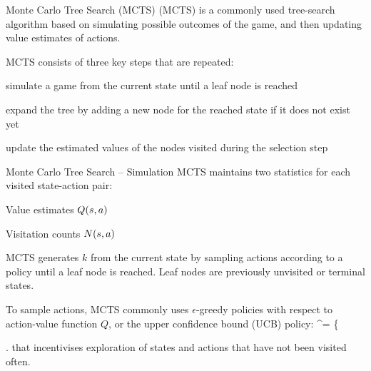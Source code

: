 \begin{frame}[t]{Monte Carlo Tree Search (MCTS)}
     (MCTS) is a commonly used tree-search algorithm based on simulating possible outcomes of the game, and then updating value estimates of actions.

    \pause

    MCTS consists of three key steps that are repeated:
    \blist
        \item<3->  simulate a game from the current state until a leaf node is reached
        \item<4->  expand the tree by adding a new node for the reached state if it does not exist yet
        \item<5->  update the estimated values of the nodes visited during the selection step
    \elist
\end{frame}

\begin{frame}[t]{Monte Carlo Tree Search -- Simulation}
    MCTS maintains two statistics for each visited state-action pair:
    \blist
        \item Value estimates $Q(s, a)$
        \item Visitation counts $N(s, a)$
    \elist

    \pause

    MCTS generates $k$  from the current state by sampling actions according to a policy until a leaf node is reached. Leaf nodes are previously unvisited or terminal states.

    \pause

    To sample actions, MCTS commonly uses $\epsilon$-greedy policies with respect to action-value function $Q$, or the upper confidence bound (UCB) policy:
    \bmath
	\ach^\tau = \left\{ \begin{array}{ll}
		\ach &  N(\sth^\tau,\ach) = 0 \\[3pt]
		\arg\max_{\ach \in \Ac} \left( Q(\sth^\tau,\ach) + \sqrt{ \frac{2 \ln N(\sth^\tau)}{N(\sth^\tau,\ach)} } \right) & \text{otherwise}
		\end{array} \right.
    \emath
    that incentivises exploration of states and actions that have not been visited often.
\end{frame}

